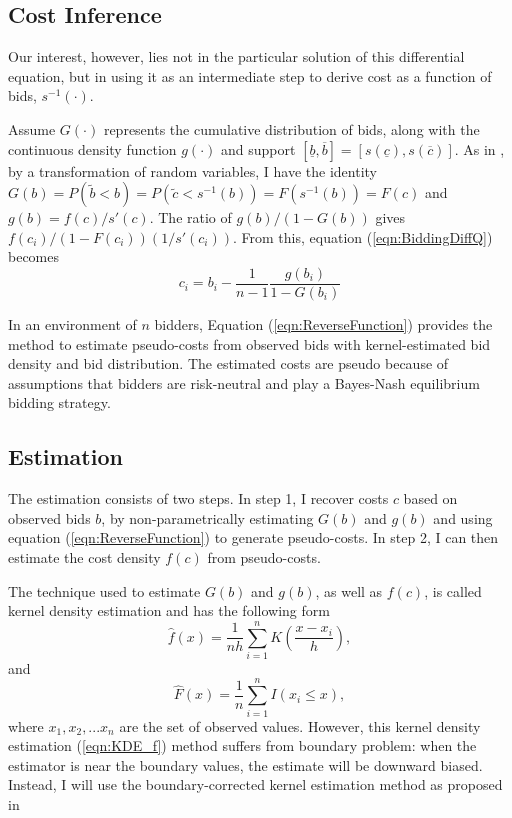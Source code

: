 \documentclass[11pt]{article}
\begin{document}
\subsection{Cost Inference}
Our interest, however, lies not in the particular solution 
of this differential equation, but in using it as an intermediate step 
to derive cost as a function of bids, $s^{-1}(\cdot)$.

Assume $G(\cdot)$ represents the cumulative distribution of bids, 
along with the continuous density function $g(\cdot)$ and support 
$[\underline{b}, \overline{b}] = [s(\underline{c}), s(\overline{c})]$.
As in \citeauthor{Guerreetal2000} \citeyear{Guerreetal2000}, by a transformation of random variables, I have the identity 
$G(b) = P(\tilde{b} < b) = P(\tilde{c} < s^{-1}(b)) = F(s^{-1}(b)) = F(c)$
and $g(b) = f(c) /s'(c)$. The ratio of $g(b)/(1 - G(b))$ gives 
$f(c_i)/(1-F(c_i))(1/s'(c_i))$. From this, equation (\ref{eqn:BiddingDiffQ}) becomes 
\begin{equation}
    \label{eqn:ReverseFunction}
    c_i = b_i - \frac{1}{n-1}\frac{g(b_i)}{1-G(b_i)}
\end{equation}

In an environment of $n$ bidders, Equation (\ref{eqn:ReverseFunction}) provides 
the method to estimate pseudo-costs from observed bids with kernel-estimated 
bid density and bid distribution. The estimated costs are pseudo because of  
assumptions that bidders are risk-neutral and play a Bayes-Nash equilibrium bidding 
strategy. 

\subsection{Estimation}
The estimation consists of two steps. In step 1, I recover costs $c$ based on 
observed bids $b$, by non-parametrically estimating $G(b)$ and $g(b)$ 
and using equation (\ref{eqn:ReverseFunction}) to 
generate pseudo-costs. In step 2, I can then estimate the cost
density $f(c)$ from pseudo-costs. 

The technique used to estimate $G(b)$ and $g(b)$, as well as $f(c)$, is called 
kernel density estimation and has the following form
\begin{equation}
    \hat{f}(x) = \frac{1}{nh}\sum_{i=1}^n K(\frac{x-x_i}{h}),
    \label{eqn:KDE_f}
\end{equation}
and 
\begin{equation}
    \hat{F}(x) = \frac{1}{n}\sum_{i=1}^n I(x_i \leq x), 
    \label{eqn:KDE_F}
\end{equation}
where ${x_1, x_2, ... x_n}$ are the set of observed values. However, this  
kernel density estimation (\ref{eqn:KDE_f}) 
method suffers from boundary 
problem: when the estimator is near the boundary values, the estimate 
will be downward biased. 
Instead, I will use the boundary-corrected kernel estimation 
method as proposed in \cite{HickmanHubbard2015}
\end{document}
